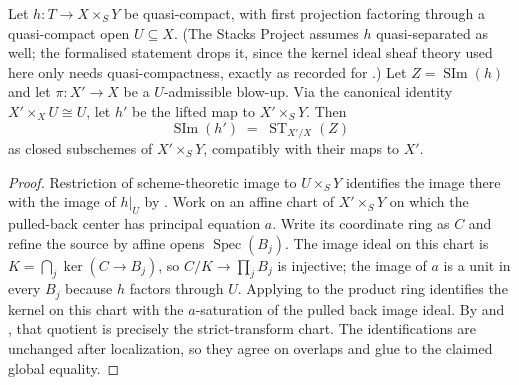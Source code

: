 \begin{lemma}
  \label{lemma:nagata-scheme-image-transport-strict-transform}
  \leanok

  Let $h\colon T\to X\times_SY$ be quasi-compact, with
  first projection factoring through a quasi-compact open $U\subseteq X$.
  (The Stacks Project assumes $h$ quasi-separated as well; the formalised
  statement drops it, since the kernel ideal sheaf theory used here only needs
  quasi-compactness, exactly as recorded for
  .)
  Let $Z=\operatorname{SIm}(h)$ and let $\pi\colon X'\to X$ be a
  $U$-admissible blow-up.  Via the canonical identity
  $X'\times_XU\cong U$, let $h'$ be the lifted map to $X'\times_SY$.  Then
  \[
    \operatorname{SIm}(h')
      \;=\;\operatorname{ST}_{X'/X}(Z)
  \]
  as closed subschemes of $X'\times_SY$, compatibly with their maps to $X'$.
\end{lemma}

\begin{proof}
  \leanok
  Restriction of scheme-theoretic image to $U\times_SY$ identifies the image
  there with the image of $h|_U$ by
  .  Work on an affine chart of
  $X'\times_SY$ on which the pulled-back center has principal equation $a$.
  Write its coordinate ring as $C$ and refine the source by affine opens
  $\operatorname{Spec}(B_j)$.  The image ideal on this chart is
  $K=\bigcap_j\ker(C\to B_j)$, so $C/K\to\prod_jB_j$ is injective; the image
  of $a$ is a unit in every $B_j$ because $h$ factors through $U$.  Applying
   to the product ring
  identifies the kernel on this chart with the $a$-saturation of the pulled
  back image ideal.  By
   and
  , that
  quotient is precisely the strict-transform chart.  The identifications are
  unchanged after localization, so they agree on overlaps and glue to the
  claimed global equality.
\end{proof}

